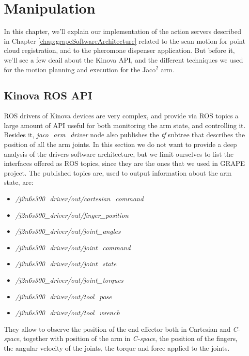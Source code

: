 
\chapter{Manipulation} \label{chap:kinovaArmChapter}

In this chapter, we'll explain our implementation of the action servers described in Chapter \ref{chap:grapeSoftwareArchitecture} related to the scan motion for point cloud registration, and to the pheromone dispenser application.
But before it, we'll see a few deail about the Kinova \ac{API}, and the different techniques we used for the motion planning and execution for the Jaco$^2$ arm.

\section{Kinova ROS API}
\ac{ROS} drivers of Kinova devices are very complex, and provide via \ac{ROS} topics a large amount of \ac{API} useful for both monitoring the arm state, and controlling it. Besides it, \textit{jaco\_arm\_driver} node also publishes the \textit{tf} subtree that describes the position of all the arm joints.
In this section we do not want to provide a deep analysis of the drivers software architecture, but we limit ourselves to list the interfaces offered as \ac{ROS} topics, since they are the ones that we used in \ac{GRAPE} project. The published topics are, used to output information about the arm state, are: 
\begin{itemize}
	\item \textit{/j2n6s300\_driver/out/cartesian\_command}
	\item \textit{/j2n6s300\_driver/out/finger\_position}
	\item \textit{/j2n6s300\_driver/out/joint\_angles}
	\item \textit{/j2n6s300\_driver/out/joint\_command}
	\item \textit{/j2n6s300\_driver/out/joint\_state}
	\item \textit{/j2n6s300\_driver/out/joint\_torques}
	\item \textit{/j2n6s300\_driver/out/tool\_pose}
	\item \textit{/j2n6s300\_driver/out/tool\_wrench}
\end{itemize}
They allow to observe the position of the end effector both in Cartesian and \textit{C-space}, together with position of the arm in \textit{C-space}, the position of the fingers, the angular velocity of the joints, the torque and force applied to the joints.

